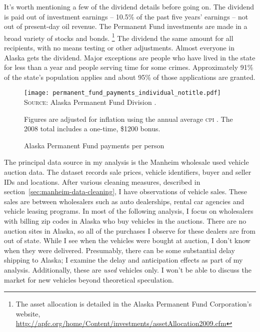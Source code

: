 \documentclass[11pt,letterpaper,oneside]{article}
\newcommand{\snippet}[1]{\hspace{-0.15em}}
\begin{document}
It's worth mentioning a few of the dividend details before going on.
The dividend is paid out of investment earnings -- 10.5\% of the past five years' earnings -- not out of present-day oil revenue.
The Permanent Fund investments are made in a broad variety of stocks and bonds.%
\footnote{The asset allocation is detailed in the Alaska Permanent Fund Corporation's website, \url{http://apfc.org/home/Content/investments/assetAllocation2009.cfm}}
The dividend the same amount for all recipients, with no means testing or other adjustments.
Almost everyone in Alaska gets the dividend.
Major exceptions are people who have lived in the state for less than a year and people serving time for some crimes.
Approximately 91\% of the state's population applies and about 95\% of those applications are granted.

\begin{figure}[bht]
    \caption{\large Alaska Permanent Fund payments per person}
    \texttt{[image: permanent\_fund\_payments\_individual\_notitle.pdf]}
    \label{fig:permanent-fund-payments-individual}
    \textsc{Source:} Alaska Permanent Fund Division \parencite{apfd_payments_summary}.\par
		Figures are adjusted for inflation using the annual average \textsc{cpi} \parencite{fred_inflation}.
		The 2008 total includes a one-time, \$1200 bonus.
\end{figure}



The principal data source in my analysis is the Manheim wholesale used vehicle auction data.
The dataset records sale prices, vehicle identifiers, buyer and seller IDs and locations.
After various cleaning measures, described in section~\ref{sec:manheim-data-cleaning}, I have
\snippet{auctions_cleaned_total_obs_count.tex}
observations of vehicle sales.
These sales are between wholesalers such as auto dealerships, rental car agencies and vehicle leasing programs.
In most of the following analysis, I focus on wholesalers with billing zip codes in Alaska who buy vehicles in the auctions.
There are no auction sites in Alaska, so all of the purchases I observe for these dealers are from out of state.
While I see when the vehicles were bought at auction, I don't know when they were delivered.
Presumably, there can be some substantial delay shipping to Alaska; I examine the delay and anticipation effects as part of my analysis.
Additionally, these are \emph{used} vehicles only.
I won't be able to discuss the market for new vehicles beyond theoretical speculation.
\end{document}
